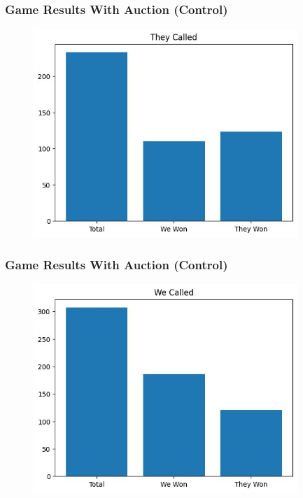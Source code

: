 \documentclass{beamer}
\begin{document}
\begin{frame}\frametitle{Game Results With Auction (Control)}
\begin{center}
        \begin{figure}
	    \includegraphics[width=10cm]{control1.png}
        \end{figure}
\end{center}
\end{frame}

\begin{frame}\frametitle{Game Results With Auction (Control)}
\begin{center}
        \begin{figure}
	    \includegraphics[width=10cm]{control2.png}
        \end{figure}
\end{center}
\end{frame}
\end{document}
